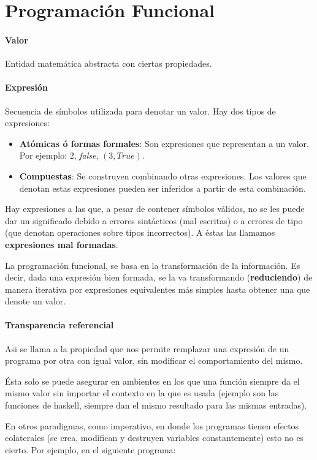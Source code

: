 
\section{Programación Funcional}

\paragraph{Valor} Entidad matemática abstracta con ciertas propiedades.

\paragraph{Expresión} 
Secuencia de símbolos utilizada para denotar un valor. Hay dos tipos de expresiones:
\begin{itemize}
	\item \textbf{Atómicas ó formas formales}: Son expresiones que representan a un valor. Por ejemplo: $2$, \textit{false}, $(3, True)$.
	\item \textbf{Compuestas}: Se construyen combinando otras expresiones. Los valores que denotan estas expresiones pueden ser inferidos a partir de esta combinación.
\end{itemize}

Hay expresiones a las que, a pesar de contener símbolos válidos, no se les puede dar un significado debido a errores sintácticos (mal escritas) o a errores de tipo (que denotan operaciones sobre tipos incorrectos). A éstas las llamamos \textbf{expresiones mal formadas}.

La programación funcional, se basa en la transformación de la información. Es decir, dada una expresión bien formada, se la va transformando (\textbf{reduciendo}) de manera iterativa por expresiones equivalentes más simples hasta obtener una que denote un valor.

\paragraph{Transparencia referencial} Asi se llama a la propiedad que nos permite remplazar una expresión de un programa por otra con igual valor, sin modificar el comportamiento del mismo.

Ésta solo se puede asegurar en ambientes en los que una función siempre da el mismo valor sin importar el contexto en la que es usada (ejemplo son las funciones de haskell, siempre dan el mismo resultado para las mismas entradas). 

En otros paradigmas, como imperativo, en donde los programas tienen efectos colaterales (se crea, modifican y destruyen variables constantemente) esto no es cierto. Por ejemplo, en el siguiente programa:

